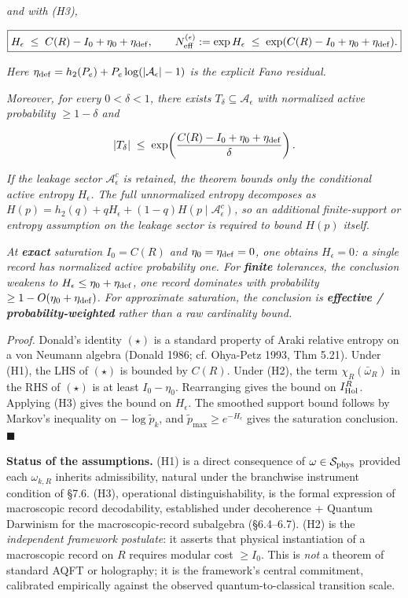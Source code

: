\documentclass[11pt,a4paper]{article}
\begin{document}
\emph{and with (H3),}

\[
\boxed{H_\epsilon \;\le\; C(R) - I_0 + \eta_0 + \eta_{\rm def}, \qquad N^{(\epsilon)}_{\rm eff} := \exp H_\epsilon \;\le\; \exp(C(R) - I_0 + \eta_0 + \eta_{\rm def}).}
\]

\emph{Here $\eta_{\rm def} = h_2(P_e) + P_e \log(|\mathcal{A}_\epsilon| - 1)$ is the explicit Fano residual.}

\emph{Moreover, for every $0 < \delta < 1$, there exists $T_\delta \subseteq \mathcal{A}_\epsilon$ with normalized active probability $\ge 1 - \delta$ and}

\[
|T_\delta| \;\le\; \exp\!\left(\frac{C(R) - I_0 + \eta_0 + \eta_{\rm def}}{\delta}\right).
\]

\emph{If the leakage sector $\mathcal{A}_\epsilon^c$ is retained, the theorem bounds only the conditional active entropy $H_\epsilon$. The full unnormalized entropy decomposes as $H(p) = h_2(q) + q H_\epsilon + (1-q) H(p \mid \mathcal{A}_\epsilon^c)$, so an additional finite-support or entropy assumption on the leakage sector is required to bound $H(p)$ itself.}

\emph{At \textbf{exact} saturation $I_0 = C(R)$ and $\eta_0 = \eta_{\rm def} = 0$, one obtains $H_\epsilon = 0$: a single record has normalized active probability one. For \textbf{finite} tolerances, the conclusion weakens to $H_\epsilon \le \eta_0 + \eta_{\rm def}$, one record dominates with probability $\ge 1 - O(\eta_0 + \eta_{\rm def})$. For approximate saturation, the conclusion is \textbf{effective / probability-weighted} rather than a raw cardinality bound.}

\emph{Proof.} Donald's identity $(\star)$ is a standard property of Araki relative entropy on a von Neumann algebra (Donald 1986; cf. Ohya-Petz 1993, Thm 5.21). Under (H1), the LHS of $(\star)$ is bounded by $C(R)$. Under (H2), the term $\chi_R(\bar\omega_R)$ in the RHS of $(\star)$ is at least $I_0 - \eta_0$. Rearranging gives the bound on $I_{\rm Hol}^R$. Applying (H3) gives the bound on $H_\epsilon$. The smoothed support bound follows by Markov's inequality on $-\log \tilde p_k$, and $\tilde p_{\max} \ge e^{-H_\epsilon}$ gives the saturation conclusion. $\blacksquare$

\textbf{Status of the assumptions.} (H1) is a direct consequence of $\omega \in \mathcal{S}_{\rm phys}$ provided each $\omega_{k,R}$ inherits admissibility, natural under the branchwise instrument condition of §7.6. (H3), operational distinguishability, is the formal expression of macroscopic record decodability, established under decoherence + Quantum Darwinism for the macroscopic-record subalgebra (§6.4–6.7). (H2) is the \emph{independent framework postulate}: it asserts that physical instantiation of a macroscopic record on $R$ requires modular cost $\ge I_0$. This is \emph{not} a theorem of standard AQFT or holography; it is the framework's central commitment, calibrated empirically against the observed quantum-to-classical transition scale.
\end{document}
